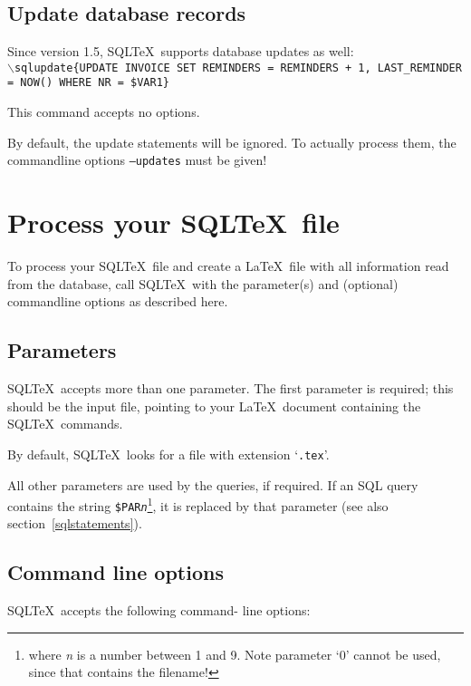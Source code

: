 \documentclass{article}
\newcommand{\bs}{\ensuremath{\backslash}}
\newcommand{\vs}{\vspace{3mm}}
\begin{document}
\subsection{Update database records}

Since version 1.5, SQL\TeX\ supports database updates as well: \\
\texttt{\bs sqlupdate\{UPDATE INVOICE SET REMINDERS = REMINDERS + 1,
LAST\_REMINDER = NOW() WHERE NR = \$VAR1\}}

This command accepts no options.

\vs

By default, the update statements will be ignored. To actually process them, the commandline options \texttt{--updates} must be given!

\section{Process your SQL\TeX\ file}

To process your SQL\TeX\ file and create a \LaTeX\ file with all information read from
the database, call SQL\TeX\ with the parameter(s) and (optional) command\-line options as
described here.

\subsection{Parameters}\label{params}

SQL\TeX\ accepts more than one parameter. The first parameter is required; this should
be the input file, pointing to your \LaTeX\ document containing the SQL\TeX\ commands.

By default, SQL\TeX\ looks for a file with extension `\texttt{.tex}'.

\vs

All other parameters are used by the queries, if required. If an SQL query contains the
string \texttt{\$PAR\textit{n}}\footnote{where \textit{n} is a number between 1 and 9. Note 
parameter `0' cannot be used, since that contains the filename!}, it is replaced by that parameter
(see also section~\ref{sqlstatements}).

\subsection{Command line options}\label{cmdline}

SQL\TeX\ accepts the following command- line options:
\end{document}
